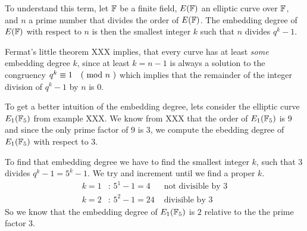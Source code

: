To understand this term, let $\mathbb{F}$ be a finite field, $E(\mathbb{F})$ an elliptic curve over $\mathbb{F}$, and $n$ a prime number that divides the order of $E(\mathbb{F})$. The embedding degree of $E(\mathbb{F})$ with respect to $n$ is then the smallest integer $k$ such that $n$ divides $q^k-1$. 

Fermat's little theorem XXX implies, that every curve has at least \textit{some} embedding degree $k$, since at least $k=n-1$ is always a solution to the congruency 
$q^k \equiv 1 \quad \text{( mod } n \text{ )}$ which implies that the remainder of the integer division of $q^k-1$ by $n$ is $0$.
\begin{example} To get a better intuition of the embedding degree, lets consider the elliptic curve $E_1(\mathbb{F}_5)$ from example XXX. We know from XXX that the order of $E_1(\mathbb{F}_5)$ is $9$ and since the only prime factor of $9$ is $3$, we compute the ebedding degree of $E_1(\mathbb{F}_5)$ with respect to $3$. 

To find that embedding degree we have to find the smallest integer $k$, such that $3$ divides $q^k-1= 5^k-1$. We try and increment until we find a proper $k$. 
\begin{align*}
k=1 &\text{: } 5^1-1 = 4 & \text{ not divisible by } 3\\ 
k=2 &\text{: } 5^2-1 = 24 & \text{ divisible by } 3
\end{align*} 
So we know that the embedding degree of $E_1(\mathbb{F}_5)$ is $2$ relative to the the prime factor $3$.
\end{example}
